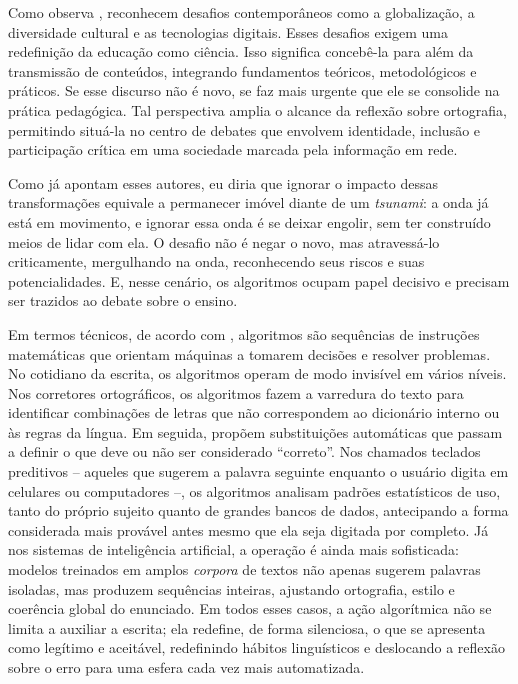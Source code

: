 \documentclass[portuguese]{textolivre}
\begin{document}
Como observa \textcite{mills2009newlearning},
\textcite{kalantzis2005learning} reconhecem desafios contemporâneos como a globalização, a diversidade cultural e as tecnologias digitais. Esses desafios exigem uma redefinição da educação como ciência. Isso significa concebê-la para além da transmissão de conteúdos, integrando fundamentos teóricos, metodológicos e práticos. Se esse discurso não é novo, se faz mais urgente que ele se consolide na prática pedagógica. Tal perspectiva amplia o alcance da reflexão sobre ortografia, permitindo situá-la no centro de debates que envolvem identidade, inclusão e participação crítica em uma sociedade marcada pela informação em rede.

Como já apontam esses autores, eu diria que ignorar o impacto dessas transformações equivale a permanecer imóvel diante de um \textit{tsunami}: a onda já está em movimento, e ignorar essa onda é se deixar engolir, sem ter construído meios de lidar com ela. O desafio não é negar o novo, mas atravessá-lo criticamente, mergulhando na onda, reconhecendo seus riscos e suas potencialidades. E, nesse cenário, os algoritmos ocupam papel decisivo e precisam ser trazidos ao debate sobre o ensino.

Em termos técnicos, de acordo com \textcite{gillespie2014algorithms}, algoritmos são sequências de instruções matemáticas que orientam máquinas a tomarem decisões e resolver problemas. No cotidiano da escrita, os algoritmos operam de modo invisível em vários níveis. Nos corretores ortográficos, os algoritmos fazem a varredura do texto para identificar combinações de letras que não correspondem ao dicionário interno ou às regras da língua. Em seguida, propõem substituições automáticas que passam a definir o que deve ou não ser considerado “correto”. Nos chamados teclados preditivos – aqueles que sugerem a palavra seguinte enquanto o usuário digita em celulares ou computadores –, os algoritmos analisam padrões estatísticos de uso, tanto do próprio sujeito quanto de grandes bancos de dados, antecipando a forma considerada mais provável antes mesmo que ela seja digitada por completo. Já nos sistemas de inteligência artificial, a operação é ainda mais sofisticada: modelos treinados em amplos \textit{corpora} de textos não apenas sugerem palavras isoladas, mas produzem sequências inteiras, ajustando ortografia, estilo e coerência global do enunciado. Em todos esses casos, a ação algorítmica não se limita a auxiliar a escrita; ela redefine, de forma silenciosa, o que se apresenta como legítimo e aceitável, redefinindo hábitos linguísticos e deslocando a reflexão sobre o erro para uma esfera cada vez mais automatizada.
\end{document}
